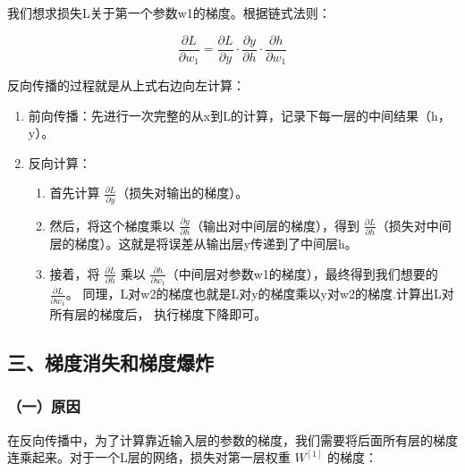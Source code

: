 我们想求损失L关于第一个参数w1的梯度。根据链式法则：

\[
\frac{\partial L}{\partial w_1}=\frac{\partial L}{\partial y}\cdot\frac{\partial y}{\partial h}\cdot\frac{\partial h}{\partial w_1}
\]

反向传播的过程就是从上式右边向左计算：

\begin{enumerate}
\def\labelenumi{\arabic{enumi}.}
\tightlist
\item
  前向传播：先进行一次完整的从x到L的计算，记录下每一层的中间结果（h，y）。
\item
{}
  反向计算：

  \begin{enumerate}
  \def\labelenumii{\alph{enumii}.}
  \tightlist
  \item
    首先计算 \(\frac{\partial L}{\partial y}\)（损失对输出的梯度）。
  \item
    然后，将这个梯度乘以 \(\frac{\partial y}{\partial h}\)（输出对中间层的梯度），得到 \(\frac{\partial L}{\partial h}\)（损失对中间层的梯度）。这就是将误差从输出层y传递到了中间层h。
  \item
    接着，将 \(\frac{\partial L}{\partial h}\) 乘以 \(\frac{\partial h}{\partial w_1}\)（中间层对参数w1的梯度），最终得到我们想要的 \(\frac{\partial L}{\partial w_1}\)。
    同理，L对w2的梯度也就是L对y的梯度乘以y对w2的梯度.计算出L对所有层的梯度后， 执行梯度下降即可。
  \end{enumerate}
\end{enumerate}

\hypertarget{ux4e09ux68afux5ea6ux6d88ux5931ux548cux68afux5ea6ux7206ux70b8}{%
\subsection{三、梯度消失和梯度爆炸}\label{ux4e09ux68afux5ea6ux6d88ux5931ux548cux68afux5ea6ux7206ux70b8}}

\hypertarget{ux4e00ux539fux56e0}{%
\subsubsection{（一）原因}\label{ux4e00ux539fux56e0}}

在反向传播中，为了计算靠近输入层的参数的梯度，我们需要将后面所有层的梯度连乘起来。对于一个L层的网络，损失对第一层权重 \(W^{[1]}\) 的梯度：

